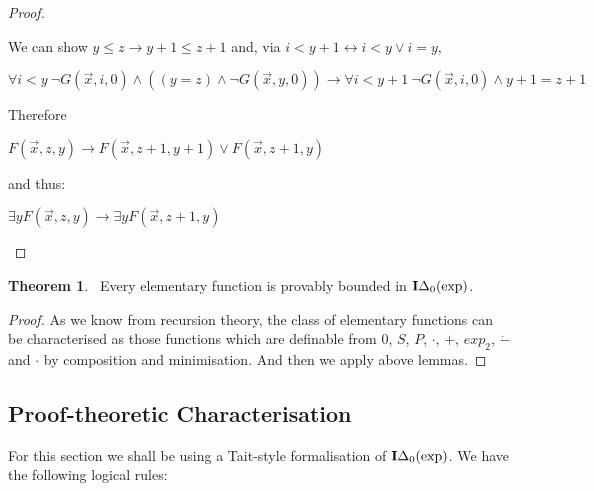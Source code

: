 \documentclass[8pt]{article}
\theoremstyle{definition}
\theoremstyle{definition}
\newtheorem{theorem}{Theorem}[section]
\theoremstyle{definition}
\theoremstyle{definition}
\theoremstyle{definition}
\theoremstyle{definition}
\theoremstyle{definition}
\theoremstyle{definition}
\theoremstyle{definition}
\theoremstyle{definition}
\theoremstyle{definition}
\theoremstyle{definition}
\theoremstyle{definition}
\theoremstyle{question}
\begin{document}
\begin{proof}
\begin{enumerate}
    We can show $y \leq z \to y + 1 \leq z + 1$ and, via $i < y + 1 \leftrightarrow i < y \lor i = y$,
    \begin{center}
      $\forall i < y \: \neg G(\vec{x}, i, 0) \land ((y = z) \land \neg G(\vec{x}, y, 0)) \to \forall i < y + 1 \: \neg G(\vec{x}, i, 0) \land y + 1 = z + 1$
    \end{center}
    Therefore
    \begin{center}
    $F(\vec{x}, z, y) \to F(\vec{x}, z + 1, y + 1) \lor F(\vec{x}, z + 1, y)$
    \end{center}
    and thus:
    \begin{center}
      $\exists y F(\vec{x}, z, y) \to \exists y F(\vec{x}, z + 1, y)$
    \end{center}
   \end{enumerate}
\end{proof}

\begin{theorem}~\label{provablysigma1:1}
  Every elementary function is provably bounded in ${\bf I}\Delta_0(\operatorname{exp})$.
\end{theorem}

\begin{proof}
  As we know from recursion theory, the class of elementary functions can be characterised
  as those functions which are definable from $0$, $S$, $P$, $\cdot$, $+$, $exp_2$, $\dot{-}$ and $\cdot$
  by composition and minimisation. And then we apply above lemmas.
\end{proof}

\subsection{Proof-theoretic Characterisation}

For this section we shall be using a Tait-style formalisation of ${\bf I}\Delta_0(\operatorname{exp})$.
We have the following logical rules:

\vspace{\baselineskip}
\end{document}
